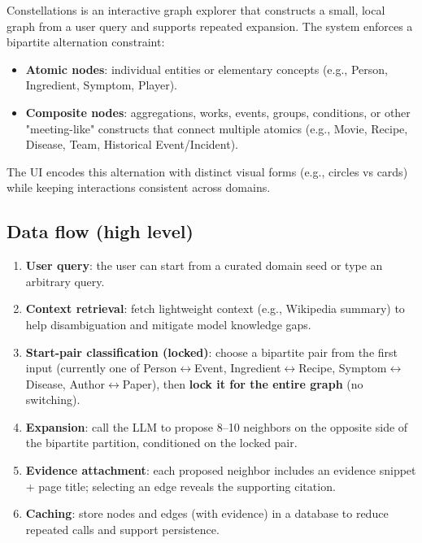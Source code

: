 Constellations is an interactive graph explorer that constructs a small, local graph from a user query and supports repeated expansion. The system enforces a bipartite alternation constraint:

\begin{itemize}[leftmargin=*]

\item \textbf{Atomic nodes}: individual entities or elementary concepts (e.g., Person, Ingredient, Symptom, Player).

\item \textbf{Composite nodes}: aggregations, works, events, groups, conditions, or other "meeting-like" constructs that connect multiple atomics (e.g., Movie, Recipe, Disease, Team, Historical Event/Incident).

\end{itemize}

The UI encodes this alternation with distinct visual forms (e.g., circles vs cards) while keeping interactions consistent across domains.

\subsection{Data flow (high level)}

\begin{enumerate}[leftmargin=*]

\item \textbf{User query}: the user can start from a curated domain seed or type an arbitrary query.

\item \textbf{Context retrieval}: fetch lightweight context (e.g., Wikipedia summary) to help disambiguation and mitigate model knowledge gaps.

\item \textbf{Start-pair classification (locked)}: choose a bipartite pair from the first input (currently one of Person\(\leftrightarrow\)Event, Ingredient\(\leftrightarrow\)Recipe, Symptom\(\leftrightarrow\)Disease, Author\(\leftrightarrow\)Paper), then \textbf{lock it for the entire graph} (no switching).

\item \textbf{Expansion}: call the LLM to propose 8--10 neighbors on the opposite side of the bipartite partition, conditioned on the locked pair.

\item \textbf{Evidence attachment}: each proposed neighbor includes an evidence snippet + page title; selecting an edge reveals the supporting citation.

\item \textbf{Caching}: store nodes and edges (with evidence) in a database to reduce repeated calls and support persistence.

\end{enumerate}

